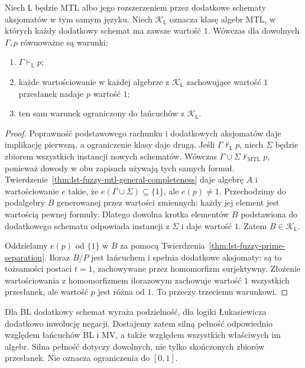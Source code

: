 \begin{twierdzenie}
\label{thm:lst-fuzzy-strong-chain-completeness}
Niech $\mathsf L$ będzie MTL albo jego rozszerzeniem przez
dodatkowe schematy aksjomatów w tym samym języku.
Niech $\mathcal K_{\mathsf L}$ oznacza klasę algebr MTL,
w których każdy dodatkowy schemat ma zawsze wartość $1$.
Wówczas dla dowolnych $\Gamma,p$ równoważne są warunki:
\begin{enumerate}
\item $\Gamma\vdash_{\mathsf L}p$;
\item każde wartościowanie w każdej algebrze z
      $\mathcal K_{\mathsf L}$ zachowujące wartość $1$ przesłanek
      nadaje $p$ wartość $1$;
\item ten sam warunek ograniczony do łańcuchów z
      $\mathcal K_{\mathsf L}$.
\end{enumerate}
\end{twierdzenie}
\begin{proof}
Poprawność podstawowego rachunku i dodatkowych aksjomatów
daje implikację pierwszą, a ograniczenie klasy daje drugą.
Jeśli $\Gamma\nvdash_{\mathsf L}p$, niech $\Sigma$ będzie
zbiorem wszystkich instancji nowych schematów.
Wówczas $\Gamma\cup\Sigma\nvdash_{\mathrm{MTL}}p$,
ponieważ dowody w obu zapisach używają tych samych formuł.
Twierdzenie~\ref{thm:lst-fuzzy-mtl-general-completeness}
daje algebrę $A$ i wartościowanie $e$ takie, że
$e(\Gamma\cup\Sigma)\subseteq\{1\}$, ale $e(p)\ne1$.
Przechodzimy do podalgebry $B$ generowanej przez wartości
zmiennych: każdy jej element jest wartością pewnej formuły.
Dlatego dowolna krotka elementów $B$ podstawiona do dodatkowego
schematu odpowiada instancji z $\Sigma$ i daje wartość $1$.
Zatem $B\in\mathcal K_{\mathsf L}$.

Oddzielamy $e(p)$ od $\{1\}$ w $B$ za pomocą
Twierdzenia~\ref{thm:lst-fuzzy-prime-separation}. Iloraz $B/P$
jest łańcuchem i spełnia dodatkowe aksjomaty: są to
tożsamości postaci $t=1$, zachowywane przez homomorfizm
surjektywny. Złożenie wartościowania z homomorfizmem
ilorazowym zachowuje wartość $1$ wszystkich przesłanek,
ale wartość $p$ jest różna od $1$. To przeczy trzeciemu
warunkowi.
\end{proof}
Dla BL dodatkowy schemat wyraża podzielność, dla logiki
Łukasiewicza dodatkowo inwolucję negacji. Dostajemy zatem
silną pełność odpowiednio względem łańcuchów BL i MV,
a także względem wszystkich właściwych im algebr.
Silna pełność dotyczy dowolnych, nie tylko skończonych
zbiorów przesłanek. Nie oznacza ograniczenia do $[0,1]$.

